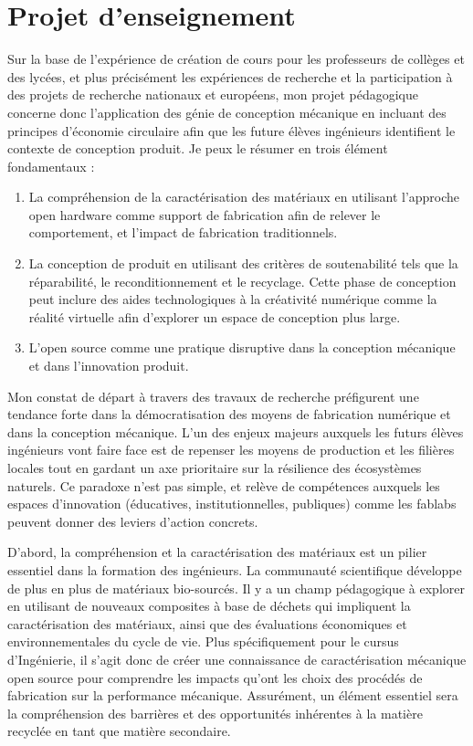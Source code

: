 \documentclass[
  12pt,
  oneside]{book}
\providecommand{\tightlist}{%
  \setlength{\itemsep}{0pt}\setlength{\parskip}{0pt}}
\begin{document}
\hypertarget{projet-denseignement}{%
\section{Projet d'enseignement}\label{projet-denseignement}}

Sur la base de l'expérience de création de cours pour les professeurs de collèges et des lycées, et plus précisément les expériences de recherche et la participation à des projets de recherche nationaux et européens, mon projet pédagogique concerne donc l'application des génie de conception mécanique en incluant des principes d'économie circulaire afin que les future élèves ingénieurs identifient le contexte de conception produit. Je peux le résumer en trois élément fondamentaux :

\begin{enumerate}
\def\labelenumi{\arabic{enumi}.}
\tightlist
\item
  La compréhension de la caractérisation des matériaux en utilisant l'approche open hardware comme support de fabrication afin de relever le comportement, et l'impact de fabrication traditionnels.
\item
  La conception de produit en utilisant des critères de soutenabilité tels que la réparabilité, le reconditionnement et le recyclage. Cette phase de conception peut inclure des aides technologiques à la créativité numérique comme la réalité virtuelle afin d'explorer un espace de conception plus large.
\item
  L'open source comme une pratique disruptive dans la conception mécanique et dans l'innovation produit.
\end{enumerate}

Mon constat de départ à travers des travaux de recherche préfigurent une tendance forte dans la démocratisation des moyens de fabrication numérique et dans la conception mécanique. L'un des enjeux majeurs auxquels les futurs élèves ingénieurs vont faire face est de repenser les moyens de production et les filières locales tout en gardant un axe prioritaire sur la résilience des écosystèmes naturels. Ce paradoxe n'est pas simple, et relève de compétences auxquels les espaces d'innovation (éducatives, institutionnelles, publiques) comme les fablabs peuvent donner des leviers d'action concrets.

D'abord, la compréhension et la caractérisation des matériaux est un pilier essentiel dans la formation des ingénieurs. La communauté scientifique développe de plus en plus de matériaux bio-sourcés. Il y a un champ pédagogique à explorer en utilisant de nouveaux composites à base de déchets qui impliquent la caractérisation des matériaux, ainsi que des évaluations économiques et environnementales du cycle de vie.
Plus spécifiquement pour le cursus d'Ingénierie, il s'agit donc de créer une connaissance de caractérisation mécanique open source pour comprendre les impacts qu'ont les choix des procédés de fabrication sur la performance mécanique. Assurément, un élément essentiel sera la compréhension des barrières et des opportunités inhérentes à la matière recyclée en tant que matière secondaire.
\end{document}
